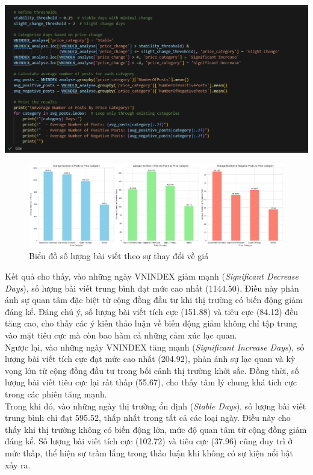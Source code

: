 \begin{center}
\includegraphics[width=1\linewidth]{images/C4_7.png}
\end{center}

\begin{figure}[H]
    \centering
    \includegraphics[width=1\linewidth]{images/C4_8.png}
    \caption{Biểu đồ số lượng bài viết theo sự thay đổi về giá}
    \label{fig:4.2}
\end{figure}

Kết quả cho thấy, vào những ngày VNINDEX giảm mạnh (\textit{Significant Decrease Days}), số lượng bài viết trung bình đạt mức cao nhất (1144.50). Điều này phản ánh sự quan tâm đặc biệt từ cộng đồng đầu tư khi thị trường có biến động giảm đáng kể. Đáng chú ý, số lượng bài viết tích cực (151.88) và tiêu cực (84.12) đều tăng cao, cho thấy các ý kiến thảo luận về biến động giảm không chỉ tập trung vào mặt tiêu cực mà còn bao hàm cả những cảm xúc lạc quan.\\

Ngược lại, vào những ngày VNINDEX tăng mạnh (\textit{Significant Increase Days}), số lượng bài viết tích cực đạt mức cao nhất (204.92), phản ánh sự lạc quan và kỳ vọng lớn từ cộng đồng đầu tư trong bối cảnh thị trường khởi sắc. Đồng thời, số lượng bài viết tiêu cực lại rất thấp (55.67), cho thấy tâm lý chung khá tích cực trong các phiên tăng mạnh.\\

Trong khi đó, vào những ngày thị trường ổn định (\textit{Stable Days}), số lượng bài viết trung bình chỉ đạt 595.52, thấp nhất trong tất cả các loại ngày. Điều này cho thấy khi thị trường không có biến động lớn, mức độ quan tâm từ cộng đồng giảm đáng kể. Số lượng bài viết tích cực (102.72) và tiêu cực (37.96) cũng duy trì ở mức thấp, thể hiện sự trầm lắng trong thảo luận khi không có sự kiện nổi bật xảy ra.

